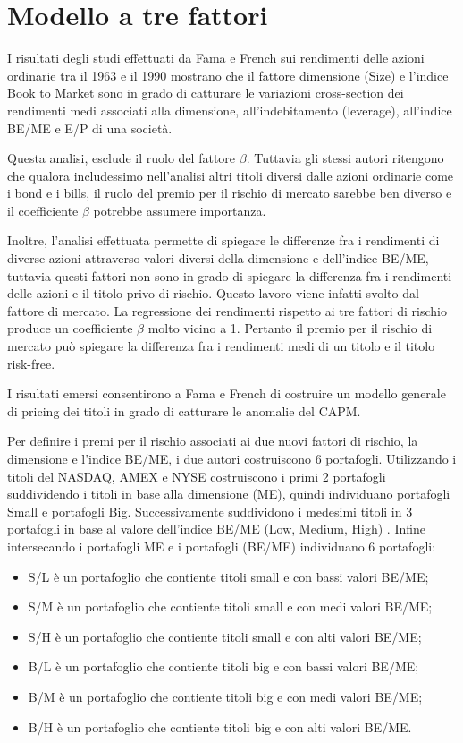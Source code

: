 \section{Modello a tre fattori} \label{sectre}

I risultati degli studi effettuati da Fama e French sui rendimenti delle azioni ordinarie tra il 1963 e il 1990 mostrano che il fattore dimensione (Size) e l'indice Book to Market sono in grado di catturare le variazioni cross-section dei rendimenti medi associati alla dimensione, all'indebitamento (leverage), all'indice BE/ME e E/P di una società. 

Questa analisi, esclude il ruolo del fattore $\beta$. Tuttavia gli stessi autori ritengono che qualora includessimo nell'analisi altri titoli diversi dalle azioni ordinarie come i bond e i bills, il ruolo del premio per il rischio di mercato sarebbe ben diverso e il coefficiente $\beta$ potrebbe assumere importanza. 

Inoltre, l'analisi effettuata permette di spiegare le differenze fra i rendimenti di diverse azioni attraverso valori diversi della dimensione e dell'indice BE/ME, tuttavia questi fattori non sono in grado di spiegare la differenza fra i rendimenti delle azioni e il titolo privo di rischio. Questo lavoro viene infatti svolto dal fattore di mercato. La regressione dei rendimenti rispetto ai tre fattori di rischio produce un coefficiente $\beta$ molto vicino a 1. Pertanto il premio per il rischio di mercato può spiegare la differenza fra i rendimenti medi di un titolo e il titolo risk-free. 

I risultati emersi consentirono a Fama e French di costruire un modello generale di pricing dei titoli in grado di catturare le anomalie del CAPM.

Per definire i premi per il rischio associati ai due nuovi fattori di rischio, la dimensione e l'indice BE/ME, i due autori costruiscono 6 portafogli. Utilizzando i titoli del NASDAQ, AMEX e NYSE costruiscono i primi 2 portafogli suddividendo i titoli in base alla dimensione (ME), quindi individuano portafogli Small e portafogli Big. Successivamente suddividono i medesimi titoli in 3 portafogli in base al valore dell'indice BE/ME (Low, Medium, High) \cite{fama_common_1993}. Infine intersecando i portafogli ME e i portafogli (BE/ME) individuano 6 portafogli: 
\begin{itemize}
	\item S/L è un portafoglio che contiente titoli small e con bassi valori BE/ME;
	\item S/M è un portafoglio che contiente titoli small e con medi valori BE/ME;
	\item S/H è un portafoglio che contiente titoli small e con alti valori BE/ME;
	\item B/L è un portafoglio che contiente titoli big  e con bassi valori BE/ME;
	\item B/M è un portafoglio che contiente titoli big  e con medi valori BE/ME;
	\item B/H è un portafoglio che contiente titoli big  e con alti valori BE/ME.
\end{itemize}

